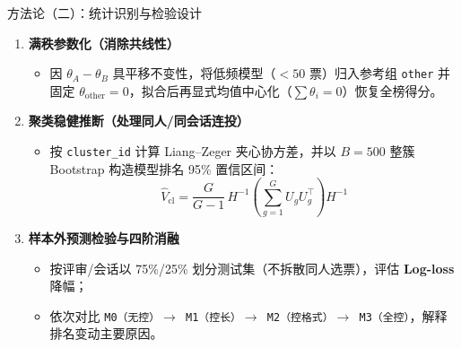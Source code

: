 \documentclass{beamer}
\begin{document}
\begin{frame}{方法论（二）：统计识别与检验设计}
  \footnotesize
  \begin{enumerate}
    \setlength{\itemsep}{0.65em}
    \item \textbf{满秩参数化（消除共线性）}
      \begin{itemize}
        \item 因 $\theta_A-\theta_B$ 具平移不变性，将低频模型（$<50$ 票）归入参考组 \texttt{other} 并固定 $\theta_{\text{other}}=0$，拟合后再显式均值中心化（$\sum \theta_i = 0$）恢复全榜得分。
      \end{itemize}
    \item \textbf{聚类稳健推断（处理同人/同会话连投）}
      \begin{itemize}
        \item 按 \texttt{cluster\_id} 计算 Liang--Zeger 夹心协方差，并以 $B=500$ 整簇 Bootstrap 构造模型排名 95\% 置信区间：
        \[\hat{V}_{\text{cl}} = \frac{G}{G-1}\, H^{-1}\!\left(\sum_{g=1}^G U_g U_g^\top\right)\!H^{-1}\]
      \end{itemize}
    \item \textbf{样本外预测检验与四阶消融}
      \begin{itemize}
        \item 按评审/会话以 75\%/25\% 划分测试集（不拆散同人选票），评估 \textbf{Log-loss} 降幅；
        \item 依次对比 \texttt{M0（无控）$\to$ M1（控长）$\to$ M2（控格式）$\to$ M3（全控）}，解释排名变动主要原因。
      \end{itemize}
  \end{enumerate}
\end{frame}
\end{document}
